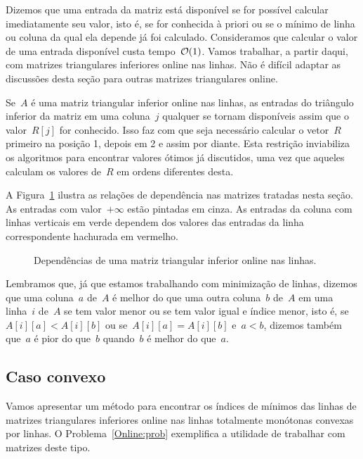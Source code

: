 Dizemos que uma entrada da matriz está disponível se for possível calcular imediatamente seu valor, isto é, se for conhecida à priori ou se o mínimo de linha ou coluna da qual ela depende já foi calculado. Consideramos que calcular o valor de uma entrada disponível custa tempo~$\mathcal{O}(1)$. Vamos trabalhar, a partir daqui, com matrizes triangulares inferiores online nas linhas. Não é difícil adaptar as discussões desta seção para outras matrizes triangulares online.

Se~$A$ é uma matriz triangular inferior online nas linhas, as entradas do triângulo inferior da matriz em uma coluna~$j$ qualquer se tornam disponíveis assim que o valor~$R[j]$ for conhecido. Isso faz com que seja necessário calcular o vetor~$R$ primeiro na posição 1, depois em 2 e assim por diante. Esta restrição inviabiliza os algoritmos para encontrar valores ótimos já discutidos, uma vez que aqueles calculam os valores de~$R$ em ordens diferentes desta.

A Figura~\ref{Online:matrix:fig} ilustra as relações de dependência nas matrizes tratadas nesta seção. As entradas com valor~$+\infty$ estão pintadas em cinza. As entradas da coluna com linhas verticais em verde dependem dos valores das entradas da linha correspondente hachurada em vermelho. 

\begin{figure}[h]
    \centering
    
    \caption{Dependências de uma matriz triangular inferior online nas linhas.} \label{Online:matrix:fig}
\end{figure}

Lembramos que, já que estamos trabalhando com minimização de linhas, dizemos que uma coluna~$a$ de~$A$ é melhor do que uma outra coluna~$b$ de~$A$ em uma linha~$i$ de~$A$ se tem valor menor ou se tem valor igual e índice menor, isto é, se~$A[i][a] < A[i][b]$ ou se~$A[i][a] = A[i][b]$ e~$a < b$, dizemos também que~$a$ é pior do que~$b$ quando~$b$ é melhor do que~$a$.


\subsection{Caso convexo} \label{Online:convex}

Vamos apresentar um método para encontrar os índices de mínimos das linhas de matrizes triangulares inferiores online nas linhas totalmente monótonas convexas por linhas. O Problema~\ref{Online:prob} exemplifica a utilidade de trabalhar com matrizes deste tipo.

